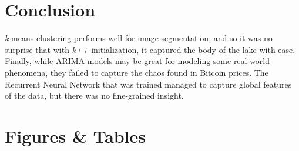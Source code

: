 \documentclass[12pt]{article}
\begin{document}
\pagebreak

\section {Conclusion}
  \par \textit{k}-means clustering performs well for image segmentation, and so it was no surprise that with \textit{k++} initialization, it captured the body of the lake with ease. Finally, while ARIMA models may be great for modeling some real-world phenomena, they failed to capture the chaos found in Bitcoin prices. The Recurrent Neural Network that was trained managed to capture global features of the data, but there was no fine-grained insight.

\pagebreak

\section {Figures \& Tables}
\end{document}
